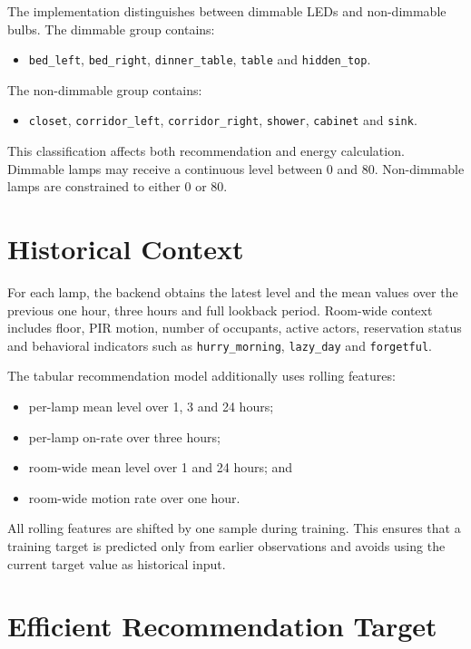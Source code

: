 The implementation distinguishes between dimmable LEDs and non-dimmable bulbs.
The dimmable group contains:

\begin{itemize}
    \item \texttt{bed\_left}, \texttt{bed\_right},
    \texttt{dinner\_table}, \texttt{table} and \texttt{hidden\_top}.
\end{itemize}

The non-dimmable group contains:

\begin{itemize}
    \item \texttt{closet}, \texttt{corridor\_left},
    \texttt{corridor\_right}, \texttt{shower}, \texttt{cabinet} and
    \texttt{sink}.
\end{itemize}

This classification affects both recommendation and energy calculation.
Dimmable lamps may receive a continuous level between 0 and 80. Non-dimmable
lamps are constrained to either 0 or 80.

\section{Historical Context}

For each lamp, the backend obtains the latest level and the mean values over
the previous one hour, three hours and full lookback period. Room-wide
context includes floor, PIR motion, number of occupants, active actors,
reservation status and behavioral indicators such as
\texttt{hurry\_morning}, \texttt{lazy\_day} and \texttt{forgetful}.

The tabular recommendation model additionally uses rolling features:

\begin{itemize}
    \item per-lamp mean level over 1, 3 and 24 hours;
    \item per-lamp on-rate over three hours;
    \item room-wide mean level over 1 and 24 hours; and
    \item room-wide motion rate over one hour.
\end{itemize}

All rolling features are shifted by one sample during training. This ensures
that a training target is predicted only from earlier observations and avoids
using the current target value as historical input.

\section{Efficient Recommendation Target}

